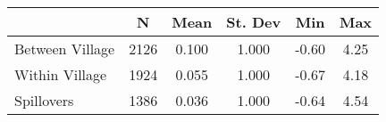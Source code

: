 \begin{tabular}{l*{5}{c}}\hline&\multicolumn{1}{c}{N}&\multicolumn{1}{c}{Mean}&\multicolumn{1}{c}{St. Dev}&\multicolumn{1}{c}{Min}&\multicolumn{1}{c}{Max}\\ \hline 
Between Village & 2126 & 0.100 & 1.000 & -0.60 & 4.25 \\
Within Village & 1924 & 0.055 & 1.000 & -0.67 & 4.18 \\
Spillovers & 1386 & 0.036 & 1.000 & -0.64 & 4.54 \\
\hline \end{tabular}
